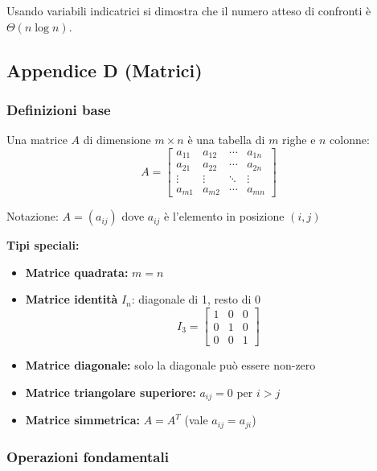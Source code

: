 \begin{esempio}
	Usando variabili indicatrici si dimostra che il numero atteso di confronti è $\Theta(n \log n)$.
\end{esempio}

\subsection{Appendice D (Matrici)}

\subsubsection{Definizioni base}

\begin{definizione}[Matrice]
	Una matrice $A$ di dimensione $m \times n$ è una tabella di $m$ righe e $n$ colonne:
	\[
	A = \begin{bmatrix}
		a_{11} & a_{12} & \cdots & a_{1n} \\
		a_{21} & a_{22} & \cdots & a_{2n} \\
		\vdots & \vdots & \ddots & \vdots \\
		a_{m1} & a_{m2} & \cdots & a_{mn}
	\end{bmatrix}
	\]
	
	Notazione: $A = (a_{ij})$ dove $a_{ij}$ è l'elemento in posizione $(i,j)$
\end{definizione}

\textbf{Tipi speciali:}
\begin{itemize}
	\item \textbf{Matrice quadrata:} $m = n$
	\item \textbf{Matrice identità} $I_n$: diagonale di 1, resto di 0
	\[
	I_3 = \begin{bmatrix}
		1 & 0 & 0 \\
		0 & 1 & 0 \\
		0 & 0 & 1
	\end{bmatrix}
	\]
	\item \textbf{Matrice diagonale:} solo la diagonale può essere non-zero
	\item \textbf{Matrice triangolare superiore:} $a_{ij} = 0$ per $i > j$
	\item \textbf{Matrice simmetrica:} $A = A^T$ (vale $a_{ij} = a_{ji}$)
\end{itemize}

\subsubsection{Operazioni fondamentali}

